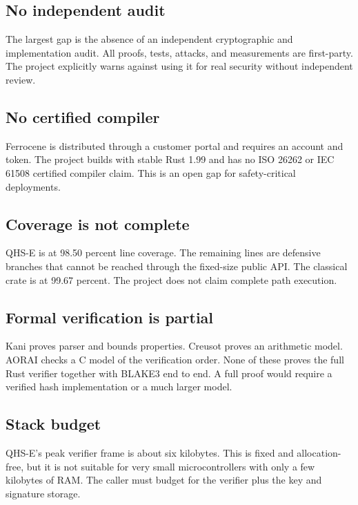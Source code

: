 \documentclass[11pt,a4paper]{article}
\begin{document}
\subsection{No independent audit}

The largest gap is the absence of an independent cryptographic and
implementation audit. All proofs, tests, attacks, and measurements are
first-party. The project explicitly warns against using it for real security
without independent review.

\subsection{No certified compiler}

Ferrocene is distributed through a customer portal and requires an account and
token. The project builds with stable Rust 1.99 and has no ISO 26262 or
IEC 61508 certified compiler claim. This is an open gap for safety-critical
deployments.

\subsection{Coverage is not complete}

QHS-E is at 98.50 percent line coverage. The remaining lines are defensive
branches that cannot be reached through the fixed-size public API. The
classical crate is at 99.67 percent. The project does not claim complete path
execution.

\subsection{Formal verification is partial}

Kani proves parser and bounds properties. Creusot proves an arithmetic model.
AORAI checks a C model of the verification order. None of these proves the
full Rust verifier together with BLAKE3 end to end. A full proof would require
a verified hash implementation or a much larger model.

\subsection{Stack budget}

QHS-E's peak verifier frame is about six kilobytes. This is fixed and
allocation-free, but it is not suitable for very small microcontrollers with
only a few kilobytes of RAM. The caller must budget for the verifier plus the
key and signature storage.
\end{document}
